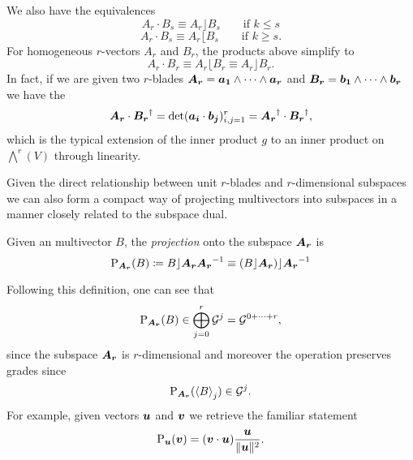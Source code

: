 We also have the equivalences
\begin{equation}
\label{eq:left_contraction_dot}
A_r \cdot B_s \equiv A_r \rfloor B_s \qquad \textrm{if $k\leq s$}
\end{equation}
\begin{equation}
\label{eq:right_contraction_dot}
A_r \cdot B_s \equiv A_r \lfloor B_s \qquad \textrm{if $k\geq s$}.
\end{equation}
For homogeneous $r$-vectors $A_r$ and $B_r$, the products above simplify to 
\begin{equation}
\label{dot_equivalent_contraction}
    A_r \cdot B_r \equiv A_r \lfloor B_r \equiv A_r \rfloor B_r.
\end{equation}
In fact, if we are given two $r$-blades $\blade{A_r} = \blade{a_1} \wedge \cdots \wedge \blade{a_r}$ and $\blade{B_r} = \blade{b_1} \wedge \cdots \wedge \blade{b_r}$ we have the 
\begin{equation}
\label{eq:dot_product}
\blade{A_r} \cdot \blade{B_r}^\dagger = \det(\blade{a_i} \cdot \blade{b_j} )_{i,j=1}^r = \blade{A_r}^\dagger \cdot \blade{B_r}^\dagger,
\end{equation}
which is the typical extension of the inner product $g$ to an inner product on $\bigwedge^r (V)$ through linearity.

Given the direct relationship between unit $r$-blades and $r$-dimensional subspaces we can also form a compact way of projecting multivectors into subspaces in a manner closely related to the subspace dual.  \begin{definition}
Given an multivector $B$, the \emph{projection} onto the subspace $\blade{A_r}$ is
\begin{equation}
\label{eq:projection}
\projection_{\blade{A_r}}(B) \coloneqq B\rfloor \blade{A_r} \blade{A_r}^{-1} \equiv (B\rfloor \blade{A_r})\rfloor \blade{A_r}^{-1}
\end{equation}
\end{definition}
Following this definition, one can see that
\begin{equation}
\projection_{\blade{A_r}}(B) \in \bigoplus_{j=0}^r \G^j = \G^{0+\cdots + r},
\end{equation}
since the subspace $\blade{A_r}$ is $r$-dimensional and moreover the operation preserves grades since
\begin{equation}
\projection_{\blade{A_r}}(\proj{j}{B}) \in \G^j.
\end{equation}
For example, given vectors $\blade{u}$ and $\blade{v}$ we retrieve the familiar statement 
\begin{equation}
\projection_{\blade{u}} (\blade{v}) = (\blade{v} \cdot \blade{u}) \frac{\blade{u}}{\|\blade{u}\|^2}.
\end{equation}

